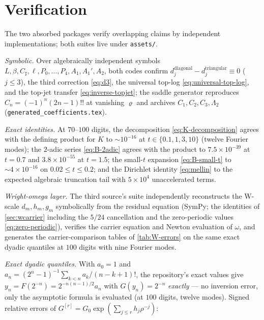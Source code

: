 \documentclass[11pt,oneside]{article}
\numberwithin{equation}{section}
\theoremstyle{definition}
\theoremstyle{remark}
\newcommand{\Csharp}{C_{\sharp}}
\newcommand{\Gzero}{G_0}
\begin{document}
\section{Verification}
\label{sec:verification-inv}

The two absorbed packages verify overlapping claims by independent
implementations; both suites live under \nolinkurl{assets/}.

\emph{Symbolic.}  Over algebraically independent symbols
$L,\beta,\Csharp,\ell,P_0,\dots,P_4,A_1,A_1',A_2$, both codes confirm
$d^{\mathrm{diagonal}}_j-d^{\mathrm{triangular}}_j\equiv0$
($j\le3$), the third correction \eqref{eq:d3}, the universal top-log
\eqref{eq:universal-top-log}, and the top-jet transfer
\eqref{eq:inverse-topjet}; the saddle generator reproduces
$C_n=(-1)^{n}(2n-1)!!$ at vanishing $\varrho$ and archives
$C_1,C_2,C_3,\Lambda_2$ (\nolinkurl{generated_coefficients.tex}).

\emph{Exact identities.}  At $70$--$100$ digits, the decomposition
\eqref{eq:K-decomposition} agrees with the defining product for
$K$ to $\sim10^{-16}$ at $t\in\{0.1,1,3,10\}$ (twelve Fourier
modes); the $2$-adic series \eqref{eq:B-2adic} agrees with the
product to $7.5\times10^{-39}$ at $t=0.7$ and
$3.8\times10^{-55}$ at $t=1.5$; the small-$t$ expansion
\eqref{eq:B-small-t} to $\sim4\times10^{-16}$ on
$0.02\le t\le0.2$; and the Dirichlet identity
\eqref{eq:mellin} to the expected algebraic truncation tail with
$5\times10^{4}$ unaccelerated terms.

\emph{Wright-omega layer.}  The third source's suite independently
reconstructs the W-scale $d_m,h_m,g_m$ symbolically from the residual
equation (SymPy; the identities of
\cref{sec:wcarrier} including the $5/24$ cancellation and the
zero-periodic values \eqref{eq:zero-periodic}), verifies the carrier
equation and Newton evaluation of $\omega$, and generates the
carrier-comparison tables of \cref{tab:W-errors} on the same exact
dyadic quantiles at $100$ digits with nine Fourier modes.

\emph{Exact dyadic quantiles.}  With $a_0=1$ and
$a_n=(2^{n}-1)^{-1}\sum_{k<n}a_k/(n-k+1)!$, the repository's exact
values give $y_n=F(2^{-n})=2^{-n(n-1)/2}a_n$ with
$G(y_n)=2^{-n}$ \emph{exactly} --- no inversion error, only the
asymptotic formula is evaluated (at $100$ digits, twelve modes).
Signed relative errors of $G^{[r]}
=\Gzero\exp(\sum_{j\le r}h_j\rho^{-j})$:
\end{document}
